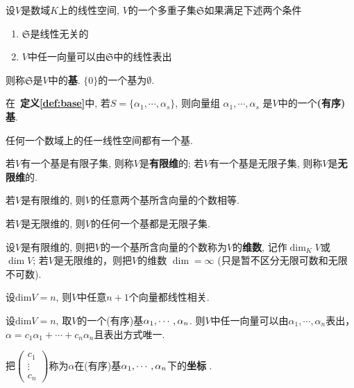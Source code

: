 \begin{Definition}[!!, 基] \label{def:base}
设$V$是数域$K$上的线性空间, $V$的一个多重子集$\mathfrak{S}$如果满足下述两个条件
\begin{enumerate}[(1)]
	\item $\mathfrak{S}$是线性无关的
	\item $V$中任一向量可以由$\mathfrak{S}$中的\;\;线性表出
\end{enumerate}
则称$\mathfrak{S}$是$V$中的\;\;\textbf{基}. $\{ 0 \}$的一个基\;\;为$\emptyset$.
\end{Definition}

\begin{Definition}[有序基]
在~\textbf{定义\ref{def:base}}中, 若$S = \{ \alpha_1, \cdots, \alpha_s \}$, 
则向量组 $\alpha_1, \cdots, \alpha_s$
是$V$中的一个\textbf{(有序)基}.
\end{Definition}


\begin{Theorem}[！依赖选择公理]
任何一个数域上的任一线性空间都有一个基.
\end{Theorem}

\begin{Definition}
若$V$有一个基是有限子集, 则称$V$是\textbf{有限维}的; 若$V$有一个基是无限子集, 则称$V$是\textbf{无限维}的. 
\end{Definition}

\begin{Theorem}
若$V$是有限维的, 则$V$的任意两个基所含向量的个数相等.
\end{Theorem}

\begin{Corollary}
若$V$是无限维的, 则$V$的任何一个基都是无限子集.
\end{Corollary}

\begin{Definition}[!!!, 维数]
设$V$是有限维的, 则把$V$的一个基所含向量的个数称为$V$的\textbf{维数}, 记作${\dim}_K V$或$\dim V$;
若$V$是无限维的，则把$V$的维数 $\dim = \infty$ (只是暂不区分无限可数和无限不可数).%
\end{Definition}

\begin{Proposition}[!]
设$\text{dim}V = n$, 则$V$中任意$n+1$个向量都线性相关.
\end{Proposition}

\begin{Definition}[!, 坐标]
设$\text{dim}V = n$, 取$V$的一个(有序)基$\alpha_{1}, \cdots, \alpha_{n}$.
则$V$中任一向量可以由$\alpha_1, \cdots, \alpha_n$表出，$\alpha = c_1 \alpha_1 + \cdots + c_n \alpha_n$且表出方式唯一. 
\begin{tightcenter}
把$\begin{pmatrix} c_1 \\ \vdots \\ c_n \end{pmatrix}$称为$\alpha$在(有序)基$\alpha_{1}, \cdots, \alpha_{n}$下的\textbf{坐标} .
\end{tightcenter}
\end{Definition}

